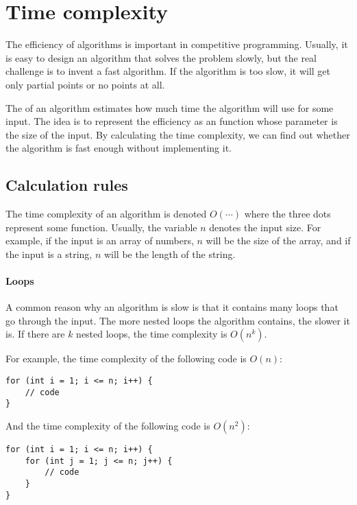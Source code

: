 \chapter{Time complexity}


The efficiency of algorithms is important in competitive programming.
Usually, it is easy to design an algorithm
that solves the problem slowly,
but the real challenge is to invent a
fast algorithm.
If the algorithm is too slow, it will get only
partial points or no points at all.

The  of an algorithm
estimates how much time the algorithm will use
for some input.
The idea is to represent the efficiency
as an function whose parameter is the size of the input.
By calculating the time complexity,
we can find out whether the algorithm is fast enough
without implementing it.

\section{Calculation rules}

The time complexity of an algorithm
is denoted $O(\cdots)$
where the three dots represent some
function.
Usually, the variable $n$ denotes
the input size.
For example, if the input is an array of numbers,
$n$ will be the size of the array,
and if the input is a string,
$n$ will be the length of the string.

\subsubsection*{Loops}

A common reason why an algorithm is slow is
that it contains many loops that go through the input.
The more nested loops the algorithm contains,
the slower it is.
If there are $k$ nested loops,
the time complexity is $O(n^k)$.

For example, the time complexity of the following code is $O(n)$:
\begin{lstlisting}
for (int i = 1; i <= n; i++) {
    // code
}
\end{lstlisting}

And the time complexity of the following code is $O(n^2)$:
\begin{lstlisting}
for (int i = 1; i <= n; i++) {
    for (int j = 1; j <= n; j++) {
        // code
    }
}
\end{lstlisting}

